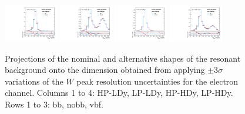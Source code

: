 \begin{figure}[htbp]
  \includegraphics[width=0.21\textwidth]{fig/uncertainties/systs_res_e_HP_vbf_LDy_resWY_ProjY.pdf}
  \includegraphics[width=0.21\textwidth]{fig/uncertainties/systs_res_e_LP_vbf_LDy_resWY_ProjY.pdf}
  \includegraphics[width=0.21\textwidth]{fig/uncertainties/systs_res_e_HP_vbf_HDy_resWY_ProjY.pdf}
  \includegraphics[width=0.21\textwidth]{fig/uncertainties/systs_res_e_LP_vbf_HDy_resWY_ProjY.pdf}\\
  \caption{
    Projections of the nominal and alternative shapes of the resonant background onto the \MJ dimension obtained from applying $\pm3\sigma$ variations of the $W$ peak resolution uncertainties for the electron channel.
    Columns 1 to 4: HP-LDy, LP-LDy, HP-HDy, LP-HDy.
    Rows 1 to 3: bb, nobb, vbf.
  }
  \label{fig:systResMJ_resWY}
\end{figure}

